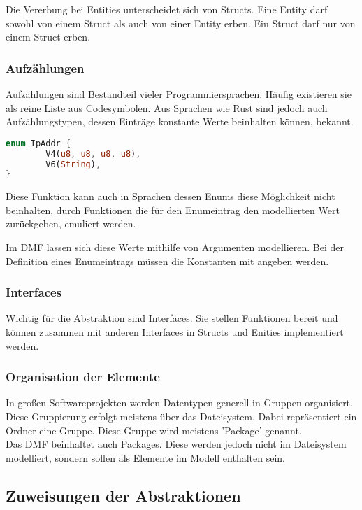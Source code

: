 \documentclass[./einleitung.tex]{subfiles}
\begin{document}
    Die Vererbung bei Entities unterscheidet sich von Structs.
    Eine Entity darf sowohl von einem Struct als auch von einer Entity erben.
    Ein Struct darf nur von einem Struct erben.

    \subsubsection{Aufzählungen}
    Aufzählungen sind Bestandteil vieler Programmiersprachen.
    Häufig existieren sie als reine Liste aus Codesymbolen.
    Aus Sprachen wie Rust sind jedoch auch Aufzählungstypen, dessen Einträge konstante Werte beinhalten können, bekannt.
    \begin{lstlisting}[language=Rust, caption=Ein Enum in Rust\cite{rustcookbook}]
enum IpAddr {
        V4(u8, u8, u8, u8),
        V6(String),
}
    \end{lstlisting}

    Diese Funktion kann auch in Sprachen dessen Enums diese Möglichkeit nicht beinhalten, durch Funktionen die für den Enumeintrag den modellierten Wert zurückgeben, emuliert werden.

    Im DMF lassen sich diese Werte mithilfe von Argumenten modellieren. Bei der Definition eines Enumeintrags müssen die Konstanten mit angeben werden.

    \subsubsection{Interfaces}
    Wichtig für die Abstraktion sind Interfaces. Sie stellen Funktionen bereit und können zusammen mit anderen Interfaces in Structs und Enities implementiert werden.

    \subsubsection{Organisation der Elemente}
    In großen Softwareprojekten werden Datentypen generell in Gruppen organisiert. Diese Gruppierung erfolgt meistens über das Dateisystem. Dabei repräsentiert ein Ordner eine Gruppe. Diese Gruppe wird meistens 'Package' genannt. \\
    Das DMF beinhaltet auch Packages. Diese werden jedoch nicht im Dateisystem modelliert, sondern sollen als Elemente im Modell enthalten sein.

    \subsection{Zuweisungen der Abstraktionen}
\end{document}
